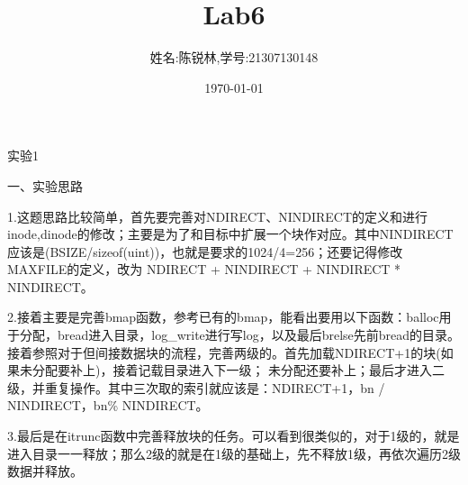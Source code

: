 \documentclass[12pt]{article}
\title{Lab6}
\author{姓名:陈锐林,学号:21307130148}
\date{\today}
\begin{document}
\maketitle
\begin{large}
    \noindent 实验1\\
\end{large}
一、实验思路\par
1.这题思路比较简单，首先要完善对NDIRECT、NINDIRECT的定义和进行inode,dinode的修改；主要是为了和目标中扩展一个块作对应。其中NINDIRECT应该是(BSIZE/sizeof(uint))，也就是要求的1024/4=256；还要记得修改MAXFILE的定义，改为
NDIRECT + NINDIRECT + NINDIRECT * NINDIRECT。\par
2.接着主要是完善bmap函数，参考已有的bmap，能看出要用以下函数：balloc用于分配，bread进入目录，log\_write进行写log，以及最后brelse先前bread的目录。接着参照对于但间接数据块的流程，完善两级的。首先加载NDIRECT+1的块(如果未分配要补上)，接着记载目录进入下一级；
未分配还要补上；最后才进入二级，并重复操作。其中三次取的索引就应该是：NDIRECT+1，bn / NINDIRECT，bn\% NINDIRECT。\par
3.最后是在itrunc函数中完善释放块的任务。可以看到很类似的，对于1级的，就是进入目录一一释放；那么2级的就是在1级的基础上，先不释放1级，再依次遍历2级数据并释放。\par
\end{document}
